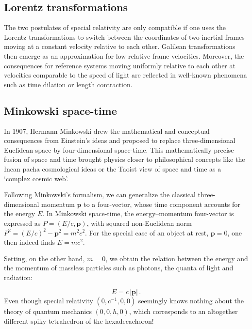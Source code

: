 \subsection*{Lorentz transformations}

The two postulates of special relativity are only compatible if one uses the Lorentz transformations to switch between the coordinates of two inertial frames moving at a constant velocity relative to each other. Galilean transformations then emerge as an approximation for low relative frame velocities. Moreover, the consequences for reference systems moving uniformly relative to each other at velocities comparable to the speed of light are reflected in well-known phenomena such as time dilation or length contraction.


\subsection*{Minkowski space-time}

In 1907, Hermann Minkowski drew the mathematical and conceptual consequences from Einstein's ideas and proposed to replace three-dimensional Euclidean space by four-dimensional space-time. This mathematically precise fusion of space and time brought physics closer to philosophical concepts like the Incan pacha cosmological ideas or the Taoist view of space and time as a \enquote*{complex cosmic web}.

Following Minkowski's formalism, we can generalize the classical three-dimensional momentum $\mathbf{p}$ to a four-vector, whose time component accounts for the energy $E$. In Minkowski space-time, the energy–momentum four-vector is expressed as $P = (E/c, \mathbf{p})$, with squared non-Euclidean norm $P^2=(E/c)^2 - \mathbf{p}^2 = m^2c^2$. For the special case of an object at rest, $\mathbf{p} = 0$, one then indeed finds $E=m c^2$.

Setting, on the other hand, $m=0$, we obtain the relation between the energy and the momentum of massless particles such as photons, the quanta of light and radiation:

\begin{equation*}\label{emc2}
  E=c\, |\mathbf{p}|\,.
\end{equation*}
%
Even though special relativity $(0,c^{-1},0,0)$ seemingly knows nothing about the theory of quantum mechanics $(0,0,h,0)$, which corresponds to an altogether different spiky tetrahedron of the hexadecachoron!

